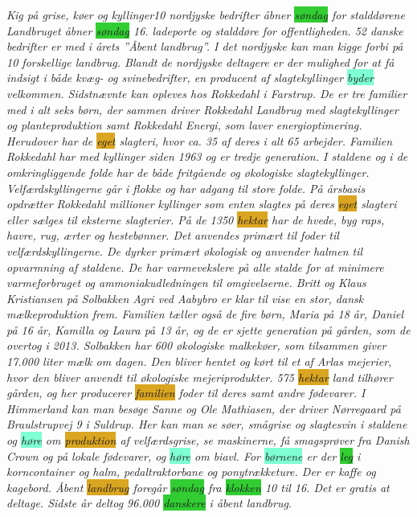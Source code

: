 \emph{
Kig på grise, køer og kyllinger10 \colorbox{Peach}{nordjyske} bedrifter åbner \colorbox{LimeGreen}{søndag} for stalddørene Landbruget åbner \colorbox{LimeGreen}{søndag} 16.  ladeporte og stalddøre for offentligheden. 52 danske bedrifter er med i årets ”Åbent landbrug”. I det \colorbox{Peach}{nordjyske} kan man kigge forbi på 10 \colorbox{Peach}{forskellige} landbrug. Blandt de \colorbox{Peach}{nordjyske} deltagere er der \colorbox{Peach}{mulighed} for at få indsigt i både kvæg- og svinebedrifter,  en producent af slagtekyllinger \colorbox{Aquamarine}{byder} velkommen. Sidstnævnte kan opleves hos Rokkedahl i Farstrup. De er tre familier med i alt \colorbox{Peach}{seks} børn, der sammen driver Rokkedahl Landbrug med slagtekyllinger og planteproduktion \colorbox{Peach}{samt} Rokkedahl Energi, som laver energioptimering. Herudover har de \colorbox{Goldenrod}{eget} slagteri, hvor ca. 35 af deres i alt 65  arbejder. Familien Rokkedahl har  med kyllinger siden 1963 og er tredje generation. I staldene og i de omkringliggende folde har de både fritgående og økologiske slagtekyllinger. Velfærdskyllingerne går i flokke og har adgang til store folde. På årsbasis opdrætter Rokkedahl  \colorbox{Peach}{millioner} kyllinger som enten slagtes på deres \colorbox{Goldenrod}{eget} slagteri eller sælges til eksterne slagterier. På de 1350 \colorbox{Goldenrod}{hektar} har de hvede, byg raps, havre, rug, ærter og hestebønner. Det anvendes primært til foder til velfærdskyllingerne. De dyrker  primært økologisk og anvender halmen til opvarmning af staldene. De har varmevekslere på alle stalde for at minimere varmeforbruget og ammoniakudledningen til omgivelserne. Britt og Klaus Kristiansen på Solbakken Agri ved Aabybro er \colorbox{Peach}{klar} til vise en stor, \colorbox{Peach}{dansk} mælkeproduktion frem. Familien tæller også de fire børn, Maria på 18 år, Daniel på 16 år, Kamilla og Laura på 13 år, og de er sjette generation på gården, som de overtog i 2013. Solbakken har 600 økologiske malkekøer, som tilsammen \colorbox{Peach}{giver} 17.000 liter mælk om dagen. Den bliver hentet og kørt til et af Arlas mejerier, hvor den bliver anvendt til økologiske mejeriprodukter. 575 \colorbox{Goldenrod}{hektar} \colorbox{Peach}{land} tilhører gården, og her producerer \colorbox{Goldenrod}{familien} foder til deres  \colorbox{Peach}{samt} andre fødevarer.  I Himmerland kan man besøge Sanne og Ole Mathiasen, der driver Nørregaard på Braulstrupvej 9 i Suldrup. Her kan man se søer, smågrise og slagtesvin i staldene og \colorbox{Aquamarine}{høre} om \colorbox{Goldenrod}{produktion} af velfærdsgrise, se maskinerne, få smagsprøver fra Danish Crown og på \colorbox{Peach}{lokale} fødevarer, og \colorbox{Aquamarine}{høre} om biavl. For \colorbox{Aquamarine}{børnene} er der \colorbox{LimeGreen}{leg} i korncontainer og halm, pedaltraktorbane og ponytrækketure. Der er kaffe og kagebord. Åbent \colorbox{Goldenrod}{landbrug} foregår \colorbox{LimeGreen}{søndag} fra \colorbox{LimeGreen}{klokken} 10 til 16. Det er gratis at deltage. Sidste år deltog 96.000 \colorbox{LimeGreen}{danskere} i åbent landbrug.
}
